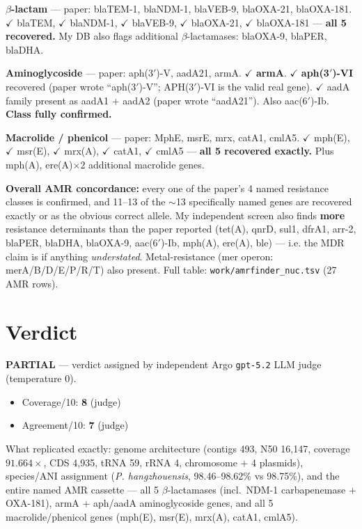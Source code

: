 \documentclass[11pt]{article}
\begin{document}
\textbf{$\beta$-lactam} --- paper: blaTEM-1, blaNDM-1, blaVEB-9, blaOXA-21, blaOXA-181.
$\checkmark$ blaTEM, $\checkmark$ blaNDM-1, $\checkmark$ blaVEB-9, $\checkmark$ blaOXA-21, $\checkmark$ blaOXA-181 ---
\textbf{all 5 recovered.} My DB also flags additional $\beta$-lactamases: blaOXA-9, blaPER, blaDHA.

\textbf{Aminoglycoside} --- paper: aph(3$'$)-V, aadA21, armA.
$\checkmark$ \textbf{armA}. $\checkmark$ \textbf{aph(3$'$)-VI} recovered (paper wrote ``aph(3$'$)-V''; APH(3$'$)-VI is
the valid real gene). $\checkmark$ aadA family present as aadA1 $+$ aadA2 (paper wrote ``aadA21''). Also aac(6$'$)-Ib.
\textbf{Class fully confirmed.}

\textbf{Macrolide / phenicol} --- paper: MphE, msrE, mrx, catA1, cmlA5.
$\checkmark$ mph(E), $\checkmark$ msr(E), $\checkmark$ mrx(A), $\checkmark$ catA1, $\checkmark$ cmlA5 ---
\textbf{all 5 recovered exactly.} Plus mph(A), ere(A)$\times$2 additional macrolide genes.

\textbf{Overall AMR concordance:} every one of the paper's 4 named resistance classes is confirmed, and
11--13 of the $\sim$13 specifically named genes are recovered exactly or as the obvious correct allele.
My independent screen also finds \textbf{more} resistance determinants than the paper reported
(tet(A), qnrD, sul1, dfrA1, arr-2, blaPER, blaDHA, blaOXA-9, aac(6$'$)-Ib, mph(A), ere(A), ble) --- i.e.
the MDR claim is if anything \textit{understated}. Metal-resistance (mer operon: merA/B/D/E/P/R/T)
also present. Full table: \texttt{work/amrfinder\_nuc.tsv} (27 AMR rows).

\section{Verdict}

\textbf{PARTIAL} --- verdict assigned by independent Argo \texttt{gpt-5.2} LLM judge (temperature 0).

\begin{itemize}
  \item Coverage/10: \textbf{8} (judge)
  \item Agreement/10: \textbf{7} (judge)
\end{itemize}

What replicated exactly: genome architecture (contigs 493, N50 16{,}147, coverage $91.664\times$,
CDS 4{,}935, tRNA 59, rRNA 4, chromosome $+$ 4 plasmids), species/ANI assignment
(\textit{P. hangzhouensis}, 98.46--98.62\% vs 98.75\%), and the entire named AMR cassette --- all 5
$\beta$-lactamases (incl.\ NDM-1 carbapenemase $+$ OXA-181), armA $+$ aph/aadA aminoglycoside genes,
and all 5 macrolide/phenicol genes (mph(E), msr(E), mrx(A), catA1, cmlA5).
\end{document}
